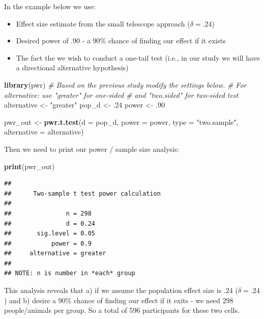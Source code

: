 \documentclass[
]{krantz}
\makeatletter
\newenvironment{Shaded}{\begin{snugshade}}{\end{snugshade}}
\newcommand{\CommentTok}[1]{\textcolor[rgb]{0.37,0.37,0.37}{\textit{#1}}}
\newcommand{\DataTypeTok}[1]{\textcolor[rgb]{0.27,0.27,0.27}{#1}}
\newcommand{\FloatTok}[1]{\textcolor[rgb]{0.06,0.06,0.06}{#1}}
\newcommand{\KeywordTok}[1]{\textcolor[rgb]{0.27,0.27,0.27}{\textbf{#1}}}
\newcommand{\NormalTok}[1]{#1}
\newcommand{\StringTok}[1]{\textcolor[rgb]{0.5,0.5,0.5}{#1}}
\newenvironment{kframe}{%
\medskip{}
\setlength{\fboxsep}{.8em}
 \def\at@end@of@kframe{}%
 \ifinner\ifhmode%
  \def\at@end@of@kframe{\end{minipage}}%
  \begin{minipage}{\columnwidth}%
 \fi\fi%
 \def\FrameCommand##1{\hskip\@totalleftmargin \hskip-\fboxsep
 \colorbox{shadecolor}{##1}\hskip-\fboxsep
     \hskip-\linewidth \hskip-\@totalleftmargin \hskip\columnwidth}%
 \MakeFramed {\advance\hsize-\width
   \@totalleftmargin\z@ \linewidth\hsize
   \@setminipage}}%
 {\par\unskip\endMakeFramed%
 \at@end@of@kframe}
\renewenvironment{Shaded}{\begin{kframe}}{\end{kframe}}
\makeatother
\begin{document}
In the example below we use:

\begin{itemize}
\item
  Effect size estimate from the small telescope approach (\(\delta = .24\))
\item
  Desired power of .90 - a 90\% chance of finding our effect if it exists
\item
  The fact the we wish to conduct a one-tail test (i.e., in our study we will have a directional alternative hypothesis)
\end{itemize}

\begin{Shaded}
\begin{Highlighting}[]
\KeywordTok{library}\NormalTok{(pwr)}
\CommentTok{# Based on the previous study modify the settings below.}
\CommentTok{# For alternative: use "greater" for one-sided }
\CommentTok{# and "two.sided" for two-sided test}
\NormalTok{alternative <-}\StringTok{ "greater"}
\NormalTok{pop_d <-}\StringTok{ }\FloatTok{.24}
\NormalTok{power <-}\StringTok{ }\FloatTok{.90}

\NormalTok{pwr_out <-}\StringTok{ }\KeywordTok{pwr.t.test}\NormalTok{(}\DataTypeTok{d =}\NormalTok{ pop_d, }
                      \DataTypeTok{power =}\NormalTok{ power,}
                      \DataTypeTok{type =} \StringTok{"two.sample"}\NormalTok{,}
                      \DataTypeTok{alternative =}\NormalTok{ alternative)}
\end{Highlighting}
\end{Shaded}

Then we need to print our power / sample size analysis:

\begin{Shaded}
\begin{Highlighting}[]
\KeywordTok{print}\NormalTok{(pwr_out)}
\end{Highlighting}
\end{Shaded}

\begin{verbatim}
## 
##      Two-sample t test power calculation 
## 
##               n = 298
##               d = 0.24
##       sig.level = 0.05
##           power = 0.9
##     alternative = greater
## 
## NOTE: n is number in *each* group
\end{verbatim}

This analysis reveals that a) if we assume the population effect size is .24 (\(\delta = .24\)) and b) desire a 90\% chance of finding our effect if it exits - we need 298 people/animals per group. So a total of 596 participants for these two cells.
\end{document}
